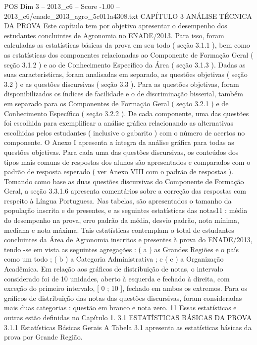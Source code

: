 \begin{textsample}{POS Dim 3 – 2013\_c6 – Score -1.00 – 2013\_c6/enade\_2013\_agro\_5c011a4308.txt}  \label{ex:f3_pos_226}
CAPÍTULO 3 ANÁLISE TÉCNICA DA PROVA Este capítulo tem por objetivo apresentar o desempenho dos estudantes concluintes de Agronomia no ENADE/2013.
Para isso, foram calculadas as estatísticas básicas da prova em seu todo ( seção 3.1.1 ), bem como as estatísticas dos componentes relacionadas ao Componente de Formação Geral ( seção 3.1.2 ) e ao de Conhecimento Específico da Área ( seção 3.1.3 ).
Dadas as suas características, foram analisadas em separado, as questões objetivas ( seção 3.2 ) e as questões discursivas ( seção 3.3 ).
Para as questões objetivas, foram disponibilizados os índices de facilidade e o de discriminação bisserial, também em separado para os Componentes de Formação Geral ( seção 3.2.1 ) e de Conhecimento Específico ( seção 3.2.2 ).
De cada componente, uma das questões foi escolhida para exemplificar a análise gráfica relacionando as alternativas escolhidas pelos estudantes ( inclusive o gabarito ) com o número de acertos no componente.
O Anexo I apresenta a íntegra da análise gráfica para todas as questões objetivas.
Para cada uma das questões discursivas, os conteúdos dos tipos mais comuns de respostas dos alunos são apresentados e comparados com o padrão de resposta esperado ( ver Anexo VIII com o padrão de respostas ).
Tomando como base as duas questões discursivas do Componente de Formação Geral, a seção 3.3.1.6 apresenta comentários sobre a correção das respostas com respeito à Língua Portuguesa.
Nas tabelas, são apresentados o tamanho da população inscrita e de presentes, e as seguintes estatísticas das notas11 : média do desempenho na prova, erro padrão da média, desvio padrão, nota mínima, mediana e nota máxima.
Tais estatísticas contemplam o total de estudantes concluintes da Área de Agronomia inscritos e presentes à prova do ENADE/2013, tendo -se em vista as seguintes agregações : ( a ) as Grandes Regiões e o país como um todo ; ( b ) a Categoria Administrativa ; e ( c ) a Organização Acadêmica.
Em relação aos gráficos de distribuição de notas, o intervalo considerado foi de 10 unidades, aberto à esquerda e fechado à direita, com exceção do primeiro intervalo, [ 0 ; 10 ], fechado em ambos os extremos.
Para os gráficos de distribuição das notas das questões discursivas, foram consideradas mais duas categorias : questão em branco e nota zero. 11 Essas estatísticas e outras estão definidas no Capítulo 1. 3.1 ESTATÍSTICAS BÁSICAS DA PROVA 3.1.1 Estatísticas Básicas Gerais A Tabela 3.1 apresenta as estatísticas básicas da prova por Grande Região.

\end{textsample}
